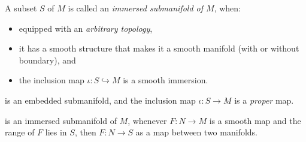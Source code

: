 \documentclass[../main-v2-manifolds.tex]{subfiles}
\begin{document}
\begin{definition}\label{lee-chp5:immersed-submanifold}
    A subset $S$ of $M$ is called an \emph{immersed submanifold of $M$}, when:
    \begin{itemize}
        \item equipped with an \emph{arbitrary topology},
        \item it has a smooth structure that makes it a smooth manifold (with or without boundary), and
        \item the inclusion map $\iota: S\hookrightarrow M$ is a smooth immersion.
    \end{itemize}
\end{definition}


\begin{definition}\label{lee-chp5:properly-embedded-submanifold}
    is an embedded submanifold, and the inclusion map $\iota:S \to M$ is a \emph{proper} map. 
\end{definition}

\begin{definition}\label{lee-chp5:weakly-embedded-submanifold}
    is an immersed submanifold of $M$, whenever $F:N\to M$ is a smooth map and the range of $F$ lies in $S$, then $F:N\to S$ as a map between two manifolds.
\end{definition}
\end{document}
